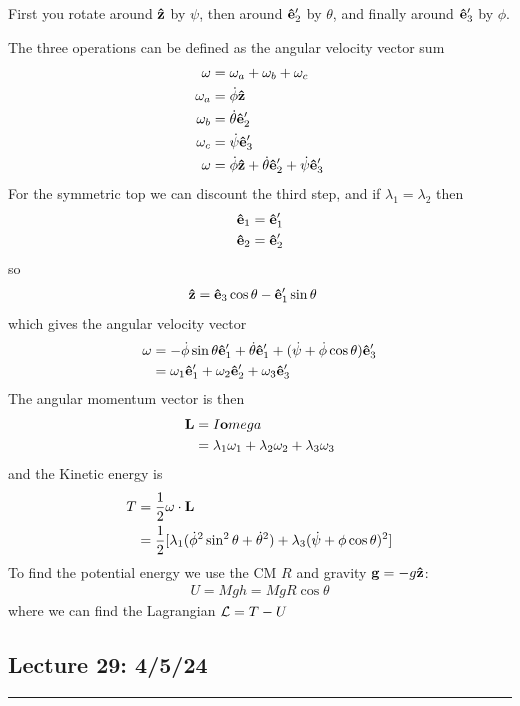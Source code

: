\documentclass[../main.tex]{subfiles}
\begin{document}
First you rotate around $\vu z$ by $\psi$, then around $\vu e_2'$ by $\theta$, and finally 
around $\vu e_3'$ by $\phi$.

The three operations can be defined as the angular velocity vector sum
\begin{align*}
    \vb \omega &= \vb \omega_a + \omega_b + \omega_c \\
    \vb \omega_a &= \dot \phi \vu z \\
    \vb \omega_b &= \dot \theta \vu e_2' \\
    \vb \omega_c &= \dot \psi \vu e_3' \\
    \vb \omega &= \dot \phi \vu z + \dot \theta \vu e_2' + \dot \psi \vu e_3'
\end{align*}
For the symmetric top we can discount the third step, and if $\lambda_1 = \lambda_2$ then
\begin{align*}
    \vu e_1 &= \vu e_1' \\
    \vu e_2 &= \vu e_2'
\end{align*}
so
\begin{align*}
    \vu z &= \vu e_3 \cos \theta - \vu e_1' \sin\theta
\end{align*}
which gives the angular velocity vector
\begin{align*}
    \vb \omega &= -\dot\phi \sin\theta \vu e_1' + \dot\theta \vu e_1' + (\dot \psi + \dot \phi \cos\theta) \vu e_3' \\
    &=\omega_1 \vu e_1' + \omega_2 \vu e_2' + \omega_3 \vu e_3'
\end{align*}
The angular momentum vector is then 
\begin{align*}
    \vb L &= I \vb omega \\
    &= \lambda_1 \omega_1 + \lambda_2 \omega_2 + \lambda_3 \omega_3
\end{align*}
and the Kinetic energy is 
\begin{align*}
    T &= \frac{1}{2} \omega \cdot \vb L \\
    &= \frac{1}{2} [\lambda_1 (\dot \phi^2 \sin^2\theta + \dot\theta^2) + \lambda_3 (\dot\psi + \do\phi \cos\theta)^2]
\end{align*}
To find the potential energy we use the CM $R$ and gravity $\vb g = - g \vu z$:
\begin{align*}
    U = Mgh = MgR \cos\theta
\end{align*}
where we can find the Lagrangian $\mathcal{L} = T - U$

\newpage
\subsection*{Lecture 29: \hfill 4/5/24}
\hrule \vspace{10px}
\end{document}
